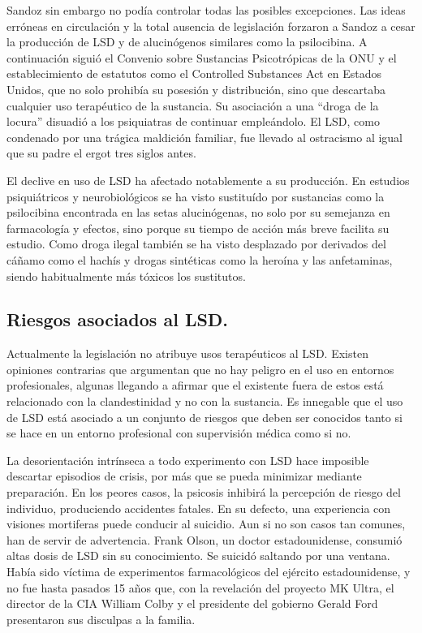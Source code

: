 Sandoz sin embargo no podía controlar todas las posibles excepciones. Las ideas erróneas en circulación y la total ausencia de legislación forzaron a Sandoz a cesar la producción de LSD y de alucinógenos similares como la psilocibina. A continuación siguió el Convenio sobre Sustancias Psicotrópicas de la ONU y el establecimiento de estatutos como el Controlled Substances Act en Estados Unidos, que no solo prohibía su posesión y distribución, sino que descartaba cualquier uso terapéutico de la sustancia. Su asociación a una \enquote{droga de la locura} disuadió a los psiquiatras de continuar empleándolo. El LSD, como condenado por una trágica maldición familiar, fue llevado al ostracismo al igual que su padre el ergot tres siglos antes.

El declive en uso de LSD ha afectado notablemente a su producción. En estudios psiquiátricos y neurobiológicos se ha visto sustituído por sustancias como la psilocibina encontrada en las setas alucinógenas, no solo por su semejanza en farmacología y efectos, sino porque su tiempo de acción más breve facilita su estudio. Como droga ilegal también se ha visto desplazado por derivados del cáñamo como el hachís y drogas sintéticas como la heroína y las anfetaminas, siendo habitualmente más tóxicos los sustitutos.

\subsection{Riesgos asociados al LSD.}

Actualmente la legislación no atribuye usos terapéuticos al LSD. Existen opiniones contrarias que argumentan que no hay peligro en el uso en entornos profesionales, algunas llegando a afirmar que el existente fuera de estos está relacionado con la clandestinidad y no con la sustancia. Es innegable que el uso de LSD está asociado a un conjunto de riesgos que deben ser conocidos tanto si se hace en un entorno profesional con supervisión médica como si no.

La desorientación intrínseca a todo experimento con LSD hace imposible descartar episodios de crisis, por más que se pueda minimizar mediante preparación. En los peores casos, la psicosis inhibirá la percepción de riesgo del individuo, produciendo accidentes fatales. En su defecto, una experiencia con visiones mortiferas puede conducir al suicidio. Aun si no son casos tan comunes, han de servir de advertencia. Frank Olson, un doctor estadounidense, consumió altas dosis de LSD sin su conocimiento. Se suicidó saltando por una ventana. Había sido víctima de experimentos farmacológicos del ejército estadounidense, y no fue hasta pasados 15 años que, con la revelación del proyecto MK Ultra, el director de la CIA William Colby y el presidente del gobierno Gerald Ford presentaron sus disculpas a la familia.

